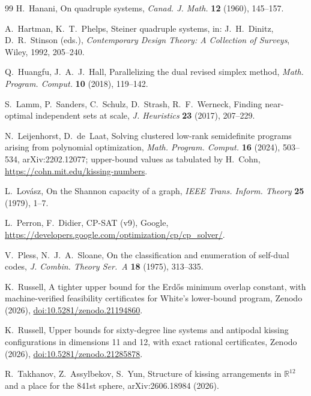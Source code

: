 \documentclass[11pt]{article}
\theoremstyle{remark}
\begin{document}
\begin{thebibliography}{99}
H.~Hanani,
On quadruple systems,
\emph{Canad. J. Math.} \textbf{12} (1960), 145--157.

A.~Hartman, K.~T.~Phelps,
Steiner quadruple systems,
in: J.~H.~Dinitz, D.~R.~Stinson (eds.),
\emph{Contemporary Design Theory: A Collection of Surveys},
Wiley, 1992, 205--240.

Q.~Huangfu, J.~A.~J.~Hall,
Parallelizing the dual revised simplex method,
\emph{Math. Program. Comput.} \textbf{10} (2018), 119--142.

S.~Lamm, P.~Sanders, C.~Schulz, D.~Strash, R.~F.~Werneck,
Finding near-optimal independent sets at scale,
\emph{J. Heuristics} \textbf{23} (2017), 207--229.

N.~Leijenhorst, D.~de~Laat,
Solving clustered low-rank semidefinite programs arising from polynomial
optimization, \emph{Math. Program. Comput.} \textbf{16} (2024), 503--534,
arXiv:2202.12077; upper-bound values as tabulated by H.~Cohn,
\url{https://cohn.mit.edu/kissing-numbers}.

L.~Lov\'asz,
On the Shannon capacity of a graph,
\emph{IEEE Trans. Inform. Theory} \textbf{25} (1979), 1--7.

L.~Perron, F.~Didier,
CP-SAT (v9), Google,
\url{https://developers.google.com/optimization/cp/cp_solver/}.

V.~Pless, N.~J.~A.~Sloane,
On the classification and enumeration of self-dual codes,
\emph{J. Combin. Theory Ser.~A} \textbf{18} (1975), 313--335.

K.~Russell,
A tighter upper bound for the Erd\H{o}s minimum overlap constant, with
machine-verified feasibility certificates for White's lower-bound program,
Zenodo (2026), \href{https://doi.org/10.5281/zenodo.21194860}{doi:10.5281/zenodo.21194860}.

K.~Russell,
Upper bounds for sixty-degree line systems and antipodal kissing
configurations in dimensions 11 and 12, with exact rational certificates,
Zenodo (2026), \href{https://doi.org/10.5281/zenodo.21285878}{doi:10.5281/zenodo.21285878}.

R.~Takhanov, Z.~Assylbekov, S.~Yun,
Structure of kissing arrangements in $\mathbb{R}^{12}$ and a place for the
841st sphere, arXiv:2606.18984 (2026).

\end{thebibliography}
\end{document}
